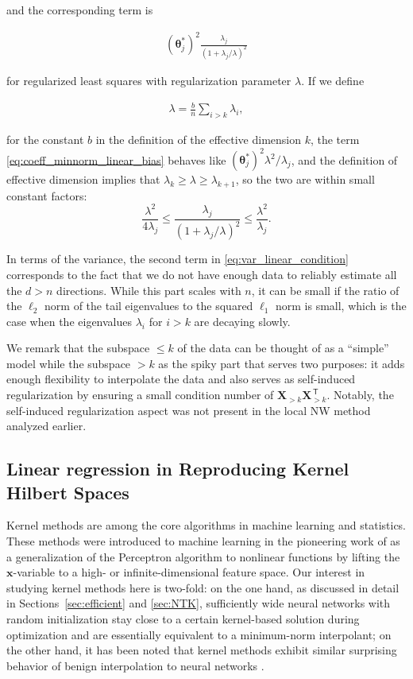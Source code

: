 and the corresponding term is

\begin{align}
	\label{eq:coeff_rls_linear_bias}
	({\boldsymbol \theta}^*_j)^2 \frac{\lambda_j}{(1+\lambda_j/\lambda)^2}
\end{align}

for regularized least squares with regularization parameter $\lambda$.
If we define

\begin{align}
    \lambda = \frac{b}{n}\sum_{i>k}\lambda_i,
  \end{align}

for the constant $b$ in the definition of the effective dimension $k$, the term \eqref{eq:coeff_minnorm_linear_bias} behaves like
$({\boldsymbol \theta}_j^*)^2 \lambda^2/\lambda_j$,
and the definition of effective dimension implies that $\lambda_k\ge \lambda\ge \lambda_{k+1}$,
so the two are within small constant factors:
  \[
    \frac{\lambda^2}{4\lambda_j} \le
    \frac{\lambda_j}{(1+\lambda_j/\lambda)^2}
    \le\frac{\lambda^2}{\lambda_j}.
  \]

In terms of the variance, the second term in \eqref{eq:var_linear_condition} corresponds to the fact that we do not have enough data to reliably estimate all the $d>n$ directions. While this part scales with $n$, it can be small if the ratio of the $\ell_2$ norm of the tail eigenvalues to the squared $\ell_1$ norm is small, which is the case when the eigenvalues $\lambda_i$ for $i>k$ are decaying slowly.

We remark that the subspace $\leq k$ of the data can be thought of as a ``simple'' model while the subspace $>k$ as the spiky part that serves two purposes: it adds enough flexibility to interpolate the data and also serves as self-induced regularization by ensuring a small condition number of ${\boldsymbol X}_{>k}{\boldsymbol X}_{>k}^\ensuremath{{\scriptscriptstyle\mathsf{\,T}}}$. Notably, the self-induced regularization aspect was not present in the local NW method analyzed earlier.
\fi

\subsection{Linear regression in Reproducing Kernel Hilbert Spaces}
\label{sec:ker_regression}

Kernel methods are among the core algorithms in machine learning and statistics. These methods were introduced to machine learning in the pioneering work of \cite{aiserman1964theoretical} as a generalization of the Perceptron algorithm to nonlinear functions by lifting the
${\boldsymbol x}$-variable to a high- or infinite-dimensional feature space. Our interest in studying kernel methods here is two-fold: on the one hand, as discussed in detail in Sections~\ref{sec:efficient} and
\ref{sec:NTK}, sufficiently wide neural networks with random initialization stay close to a certain kernel-based solution during optimization and are essentially equivalent to a minimum-norm interpolant; on the other hand, it has been noted that kernel methods exhibit similar surprising behavior of benign interpolation to neural networks \cite{belkin2018understand}. 

